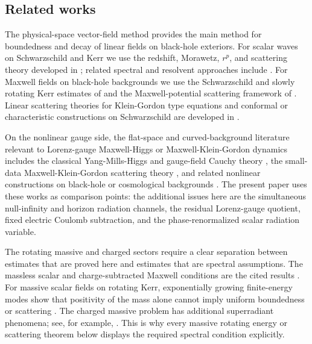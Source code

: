 \documentclass[11pt]{article}
\numberwithin{equation}{section}
\theoremstyle{plain}
\theoremstyle{definition}
\theoremstyle{remark}
\begin{document}
\subsection{Related works}

The physical-space vector-field method provides the main method for boundedness and decay of linear fields on black-hole exteriors.  For scalar waves on Schwarzschild and Kerr we use the redshift, Morawetz, \(r^p\), and scattering theory developed in \cite{DRSRKerr,DRSRKerrIII,dafermos,Blue2,DafermosRodnianskiPhysicalSpace,DafermosRodnianskiSlowKerr,TataruTohaneanuKerr,MoschidisRp}; related spectral and resolvent approaches include \cite{FinsterKamranSmollerYau,WunschZworski,MetcalfeTataruTohaneanu}.  For Maxwell fields on black-hole backgrounds we use the Schwarzschild and slowly rotating Kerr estimates of \cite{AnderssonBlueMaxwellSlowKerr,Blue,Ander1} and the Maxwell-potential scattering framework of \cite{NicolasTaujanskasMaxwellPotentials}.  Linear scattering theories for Klein-Gordon type equations and conformal or characteristic constructions on Schwarzschild are developed in \cite{Dimock,BachelotKG,NicolasSchw}.

On the nonlinear gauge side, the flat-space and curved-background literature relevant to Lorenz-gauge Maxwell-Higgs or Maxwell-Klein-Gordon dynamics includes the classical Yang-Mills-Higgs and gauge-field Cauchy theory \cite{EardleyMoncriefI,EardleyMoncriefII,GinibreVeloLorenzGauge,KlainermanMachedonMKG,MachedonSterbenzMKG,MasmoudiMKGUniqueness}, the small-data Maxwell-Klein-Gordon scattering theory \cite{CandyKauffmanLindblad,HeMKGInfinity,ChenMassiveMKG,DaiMeiWeiYang}, and related nonlinear constructions on black-hole or cosmological backgrounds \cite{Blue2,NicolasNlKGKerr,XuanSchw,TaujanskasdS,mokdad}.  The present paper uses these works as comparison points: the additional issues here are the simultaneous null-infinity and horizon radiation channels, the residual Lorenz-gauge quotient, fixed electric Coulomb subtraction, and the phase-renormalized scalar radiation variable.

The rotating massive and charged sectors require a clear separation between estimates that are proved here and estimates that are spectral assumptions.  The massless scalar and charge-subtracted Maxwell conditions are the cited results \cite{DRSRKerr,DRSRKerrIII,AnderssonBlueMaxwellSlowKerr}.  For massive scalar fields on rotating Kerr, exponentially growing finite-energy modes show that positivity of the mass alone cannot imply uniform boundedness or scattering \cite{ShlapentokhRothmanKGKerr}.  The charged massive problem has additional superradiant phenomena; see, for example, \cite{BachelotSuperradiance,FuruhashiNambuKerrNewman}.  This is why every massive rotating energy or scattering theorem below displays the required spectral condition explicitly.
\end{document}
